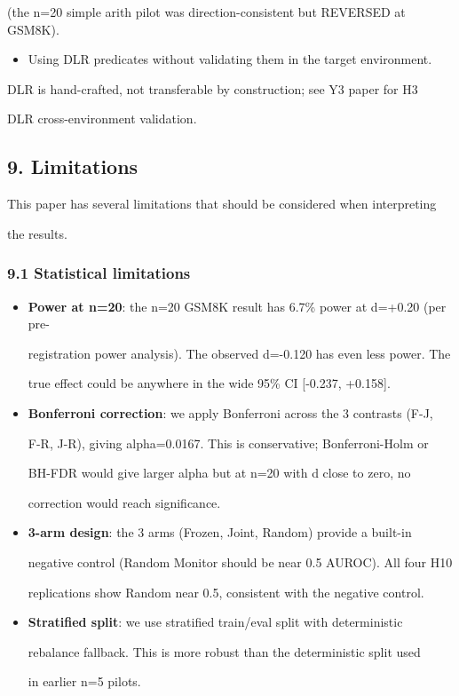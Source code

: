 \documentclass[11pt]{article}
\begin{document}
(the n=20 simple arith pilot was direction-consistent but REVERSED at
GSM8K).

\begin{itemize}

\item
  Using DLR predicates without validating them in the target
  environment.
\end{itemize}

DLR is hand-crafted, not transferable by construction; see Y3 paper for
H3

DLR cross-environment validation.

\subsection{9. Limitations}\label{limitations}

This paper has several limitations that should be considered when
interpreting

the results.

\subsubsection{9.1 Statistical
limitations}\label{statistical-limitations}

\begin{itemize}
\item
  \textbf{Power at n=20}: the n=20 GSM8K result has 6.7\% power at
  d=+0.20 (per pre-

  registration power analysis). The observed d=-0.120 has even less
  power. The

  true effect could be anywhere in the wide 95\% CI {[}-0.237,
  +0.158{]}.
\item
  \textbf{Bonferroni correction}: we apply Bonferroni across the 3
  contrasts (F-J,

  F-R, J-R), giving alpha=0.0167. This is conservative; Bonferroni-Holm
  or

  BH-FDR would give larger alpha but at n=20 with d close to zero, no

  correction would reach significance.
\item
  \textbf{3-arm design}: the 3 arms (Frozen, Joint, Random) provide a
  built-in

  negative control (Random Monitor should be near 0.5 AUROC). All four
  H10

  replications show Random near 0.5, consistent with the negative
  control.
\item
  \textbf{Stratified split}: we use stratified train/eval split with
  deterministic

  rebalance fallback. This is more robust than the deterministic split
  used

  in earlier n=5 pilots.
\end{itemize}
\end{document}
